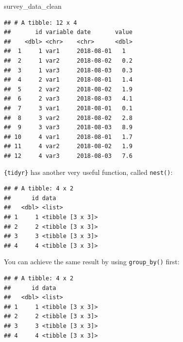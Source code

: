 \documentclass[]{gitbook}
\newenvironment{Shaded}{\begin{snugshade}}{\end{snugshade}}
\newcommand{\KeywordTok}[1]{\textcolor[rgb]{0.13,0.29,0.53}{\textbf{#1}}}
\newcommand{\NormalTok}[1]{#1}
\newcommand{\OperatorTok}[1]{\textcolor[rgb]{0.81,0.36,0.00}{\textbf{#1}}}
\newcommand{\StringTok}[1]{\textcolor[rgb]{0.31,0.60,0.02}{#1}}
\theoremstyle{definition}
\theoremstyle{definition}
\theoremstyle{definition}
\theoremstyle{remark}
\begin{document}
\begin{Shaded}
\begin{Highlighting}[]
\NormalTok{survey_data_clean}
\end{Highlighting}
\end{Shaded}

\begin{verbatim}
## # A tibble: 12 x 4
##       id variable date       value
##    <dbl> <chr>    <chr>      <dbl>
##  1     1 var1     2018-08-01   1  
##  2     1 var2     2018-08-02   0.2
##  3     1 var3     2018-08-03   0.3
##  4     2 var1     2018-08-01   1.4
##  5     2 var2     2018-08-02   1.9
##  6     2 var3     2018-08-03   4.1
##  7     3 var1     2018-08-01   0.1
##  8     3 var2     2018-08-02   2.8
##  9     3 var3     2018-08-03   8.9
## 10     4 var1     2018-08-01   1.7
## 11     4 var2     2018-08-02   1.9
## 12     4 var3     2018-08-03   7.6
\end{verbatim}

\texttt{\{tidyr\}} has another very useful function, called
\texttt{nest()}:

\begin{Shaded}
\end{Shaded}

\begin{verbatim}
## # A tibble: 4 x 2
##      id data            
##   <dbl> <list>          
## 1     1 <tibble [3 x 3]>
## 2     2 <tibble [3 x 3]>
## 3     3 <tibble [3 x 3]>
## 4     4 <tibble [3 x 3]>
\end{verbatim}

You can achieve the same result by using \texttt{group\_by()} first:

\begin{Shaded}
\end{Shaded}

\begin{verbatim}
## # A tibble: 4 x 2
##      id data            
##   <dbl> <list>          
## 1     1 <tibble [3 x 3]>
## 2     2 <tibble [3 x 3]>
## 3     3 <tibble [3 x 3]>
## 4     4 <tibble [3 x 3]>
\end{verbatim}
\end{document}
